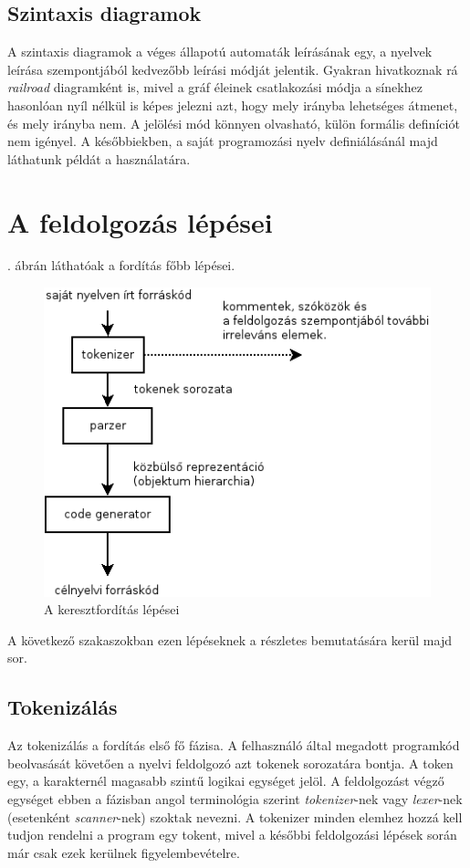 \subsection{Szintaxis diagramok}

A szintaxis diagramok a véges állapotú automaták leírásának egy, a nyelvek leírása szempontjából kedvezőbb leírási módját jelentik. Gyakran hivatkoznak rá \textit{railroad} diagramként is, mivel a gráf éleinek csatlakozási módja a sínekhez hasonlóan nyíl nélkül is képes jelezni azt, hogy mely irányba lehetséges átmenet, és mely irányba nem. A jelölési mód könnyen olvasható, külön formális definíciót nem igényel. A későbbiekben, a saját programozási nyelv definiálásánál majd láthatunk példát a használatára.

\section{A feldolgozás lépései}

. ábrán láthatóak a fordítás főbb lépései.
\begin{figure}
\centering
\includegraphics[scale=1]{kepek/process.png}
\caption{A keresztfordítás lépései}
\label{fig:process}
\end{figure}
A következő szakaszokban ezen lépéseknek a részletes bemutatására kerül majd sor.

\subsection{Tokenizálás}

Az tokenizálás a fordítás első fő fázisa. A felhasználó által megadott programkód beolvasását követően a nyelvi feldolgozó azt tokenek sorozatára bontja.
A token egy, a karakternél magasabb szintű logikai egységet jelöl.
A feldolgozást végző egységet ebben a fázisban angol terminológia szerint \textit{tokenizer}-nek vagy \textit{lexer}-nek (esetenként \textit{scanner}-nek) szoktak nevezni.
A tokenizer minden elemhez hozzá kell tudjon rendelni a program egy tokent, mivel a későbbi feldolgozási lépések során már csak ezek kerülnek figyelembevételre.

